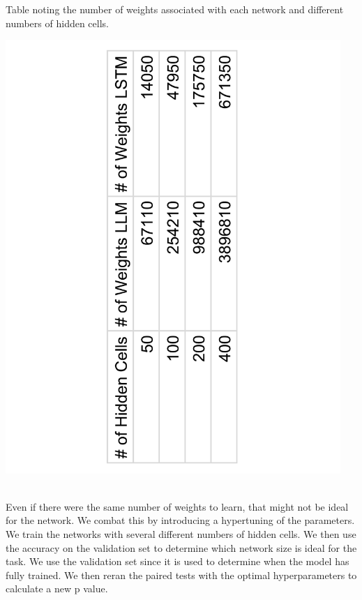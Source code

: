 \begin{table}
    \caption[Number of Weights]{Table noting the number of weights associated with each network and different numbers of hidden cells.}
    \label{tab:hiddenweights}
    \begin{center}
    \vspace{-4cm}
	\includegraphics[width=5in, angle=270]{figures/Hidden_Weights.pdf}
    \end{center}
\end{table}
\textit{ }
\\Even if there were the same number of weights to learn, that might not be ideal for the network. We combat this by introducing a hypertuning of the parameters. We train the networks with several different numbers of hidden cells. We then use the accuracy on the validation set to determine which network size is ideal for the task. We use the validation set since it is used to determine when the model has fully trained. We then reran the paired tests with the optimal hyperparameters to calculate a new p value.

